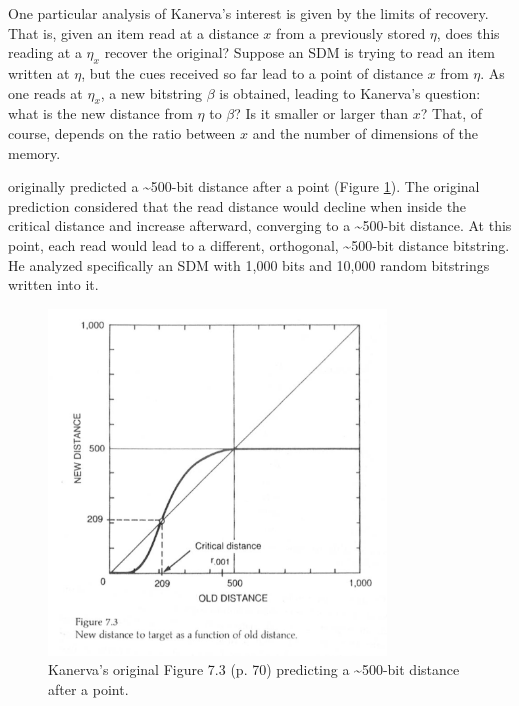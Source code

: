 
One particular analysis of Kanerva's interest is given by the limits of recovery.  That is, given an item read at a distance $x$ from a previously stored $\eta$, does this reading at a $\eta_x$ recover the original? Suppose an SDM is trying to read an item written at $\eta$, but the cues received so far lead to a point of distance $x$ from $\eta$.  As one reads at $\eta_x$, a new bitstring $\beta$ is obtained, leading to Kanerva's question: what is the new distance from $\eta$ to $\beta$? Is it smaller or larger than $x$? That, of course, depends on the ratio between $x$ and the number of dimensions of the memory.

\citet[p.70]{Kanerva1988} originally predicted a \textasciitilde 500-bit distance after a point (Figure \ref{fig:kanerva-figure-7.3}). The original prediction considered that the read distance would decline when inside the critical distance and increase afterward, converging to a \textasciitilde 500-bit distance.  At this point, each read would lead to a different, orthogonal, \textasciitilde 500-bit distance bitstring. He analyzed specifically an SDM with 1,000 bits and 10,000 random bitstrings written into it.

\begin{figure}[h]
\centering\includegraphics[width=0.8\textwidth]{images02/kanerva-table-7-2-original.png}
\caption{Kanerva's original Figure 7.3 (p. 70) predicting a \textasciitilde 500-bit distance after a point.
\label{fig:kanerva-figure-7.3}}
\end{figure}

